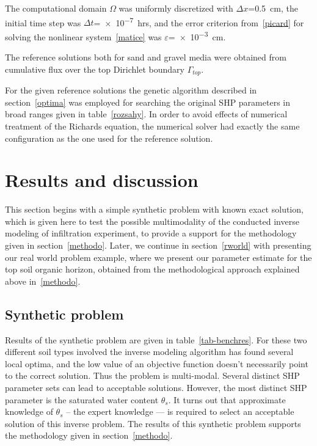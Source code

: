 \documentclass[review,times,3p,10pt]{elsarticle}
\begin{document}
{ 
  The computational domain $\Omega$ was uniformly discretized with $\Delta x$=0.5~cm, the initial time step was $\Delta t$=\num{e-7}~hrs, and the error criterion from~\eqref{picard} for solving the nonlinear system~\eqref{matice} was   $\varepsilon$=\num{e-3}~cm.
 
 The reference solutions both for sand and gravel media were obtained from  cumulative flux over the top Dirichlet boundary $\Gamma_{top}$.
 
For the given reference solutions the genetic algorithm described in section~\ref{optima} was employed for searching the original SHP parameters in broad ranges given in table~\ref{rozsahy}. 
In order to avoid effects of numerical treatment of the Richards equation, the numerical solver had exactly the same configuration as the one used for the reference solution.



}


 



\section{Results and discussion} 

This section begins with a simple synthetic problem with known exact solution, which is given here to test the possible multimodality of the conducted inverse modeling of infiltration experiment, to provide a support for the methodology given in section~\ref{methodo}. Later,  we continue in section~\ref{rworld} with presenting our real world problem example, where we  present our parameter estimate for the top soil organic horizon, obtained from the methodological approach explained above in~\ref{methodo}.

\subsection{Synthetic problem}
 \label{benchmarks}
 
 
 
Results of the synthetic problem are given in table~\ref{tab-benchres}. For these two different soil types involved  the inverse modeling algorithm has found several local optima, and the low value of an objective function doesn't necessarily  point to the correct solution. Thus the problem is multi-modal. Several distinct SHP parameter sets can lead to acceptable solutions. However, the most distinct SHP parameter is the saturated water content $\theta_s$. {It turns out that approximate knowledge of $\theta_s$ -- the expert knowledge --- is required to select an acceptable solution of this inverse problem. }{ The results of this synthetic problem supports the methodology given in section~\ref{methodo}.}
\end{document}
